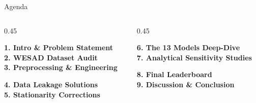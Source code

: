 \documentclass[aspectratio=169, 10pt]{beamer}
\begin{document}
\begin{frame}{Agenda}
    \begin{columns}[T]
        \begin{column}{0.45\textwidth}
            \begin{tcolorbox}[colback=Onyx!5, colframe=Onyx, title=PHASE A: THE DATA]
                \small \textbf{1. Intro \& Problem Statement}\\
                \textbf{2. WESAD Dataset Audit}\\
                \textbf{3. Preprocessing \& Engineering}
            \end{tcolorbox}
            \begin{tcolorbox}[colback=Onyx!5, colframe=Onyx, title=PHASE B: THE FIXES]
                \small \textbf{4. Data Leakage Solutions}\\
                \textbf{5. Stationarity Corrections}
            \end{tcolorbox}
        \end{column}
        \begin{column}{0.45\textwidth}
            \begin{tcolorbox}[colback=WarmGold!10, colframe=WarmGold, title=PHASE C: MODELING]
                \small \textbf{6. The 13 Models Deep-Dive}\\
                \textbf{7. Analytical Sensitivity Studies}
            \end{tcolorbox}
            \begin{tcolorbox}[colback=WarmGold!10, colframe=WarmGold, title=PHASE D: VERDICT]
                \small \textbf{8. Final Leaderboard}\\
                \textbf{9. Discussion \& Conclusion}
            \end{tcolorbox}
        \end{column}
    \end{columns}
\end{frame}
\end{document}
